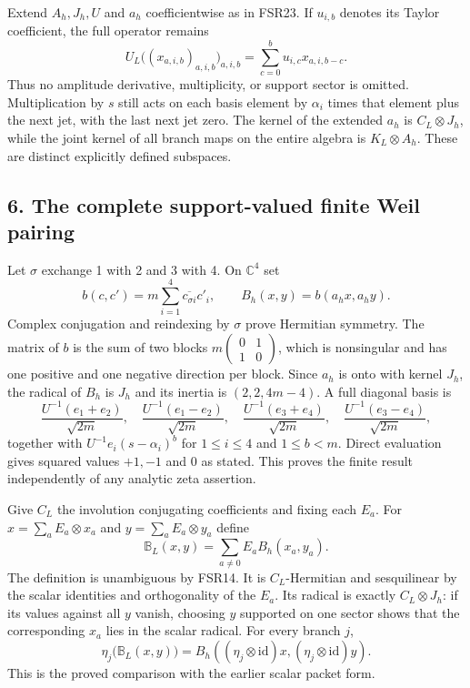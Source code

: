 \documentclass[
  10pt,
  a4paper,
]{article}
\begin{document}
Extend \(A_h,J_h,U\) and \(a_h\) coefficientwise as in FSR23. If
\(u_{i,b}\) denotes its Taylor coefficient, the full operator remains \[
U_L\bigl((x_{a,i,b})_{a,i,b}\bigr)_{a,i,b}
=\sum_{c=0}^{b}u_{i,c}x_{a,i,b-c}.
\tag{FSR26}
\] Thus no amplitude derivative, multiplicity, or support sector is
omitted. Multiplication by \(s\) still acts on each basis element by
\(\alpha_i\) times that element plus the next jet, with the last next
jet zero. The kernel of the extended \(a_h\) is \(C_L\otimes J_h\),
while the joint kernel of all branch maps on the entire algebra is
\(K_L\otimes A_h\). These are distinct explicitly defined subspaces.

\subsection{6. The complete support-valued finite Weil
pairing}\label{the-complete-support-valued-finite-weil-pairing}

Let \(\sigma\) exchange 1 with 2 and 3 with 4. On \(\mathbb C^4\) set \[
b(c,c')=m\sum_{i=1}^4\overline{c_{\sigma i}}c'_i,
\qquad B_h(x,y)=b(a_hx,a_hy).
\tag{FSR27}
\] Complex conjugation and reindexing by \(\sigma\) prove Hermitian
symmetry. The matrix of \(b\) is the sum of two blocks
\(m\left(\begin{smallmatrix}0&1\\1&0\end{smallmatrix}\right)\), which is
nonsingular and has one positive and one negative direction per block.
Since \(a_h\) is onto with kernel \(J_h\), the radical of \(B_h\) is
\(J_h\) and its inertia is \((2,2,4m-4)\). A full diagonal basis is \[
\frac{U^{-1}(e_1+e_2)}{\sqrt{2m}},\quad
\frac{U^{-1}(e_1-e_2)}{\sqrt{2m}},\quad
\frac{U^{-1}(e_3+e_4)}{\sqrt{2m}},\quad
\frac{U^{-1}(e_3-e_4)}{\sqrt{2m}},
\] together with \(U^{-1}e_i(s-\alpha_i)^b\) for \(1\le i\le4\) and
\(1\le b<m\). Direct evaluation gives squared values \(+1,-1\) and 0 as
stated. This proves the finite result independently of any analytic zeta
assertion.

Give \(C_L\) the involution conjugating coefficients and fixing each
\(E_a\). For \(x=\sum_a E_a\otimes x_a\) and \(y=\sum_a E_a\otimes y_a\)
define \[
\mathbb B_L(x,y)=\sum_{a\neq0}E_a B_h(x_a,y_a).
\tag{FSR28}
\] The definition is unambiguous by FSR14. It is \(C_L\)-Hermitian and
sesquilinear by the scalar identities and orthogonality of the \(E_a\).
Its radical is exactly \(C_L\otimes J_h\): if its values against all
\(y\) vanish, choosing \(y\) supported on one sector shows that the
corresponding \(x_a\) lies in the scalar radical. For every branch
\(j\), \[
\eta_j\bigl(\mathbb B_L(x,y)\bigr)
=B_h((\eta_j\otimes\mathrm{id})x,(\eta_j\otimes\mathrm{id})y).
\tag{FSR29}
\] This is the proved comparison with the earlier scalar packet form.
\end{document}

